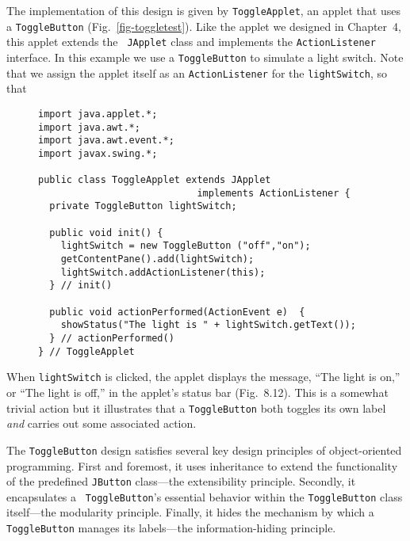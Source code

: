 The implementation of this design is given by {\tt ToggleApplet}, an
applet that uses a {\tt ToggleButton} (Fig.~\ref{fig-toggletest}).
Like the applet we designed in Chapter~4, this applet extends the {\tt
JApplet} class and implements the {\tt ActionListener} interface.  In
this example we use a {\tt ToggleButton} to simulate a light switch.
Note that we assign the applet itself as an {\tt ActionListener} for
the {\tt lightSwitch}, so that

\begin{figure}[tb]
\jjjprogstart
\begin{jjjlisting}
\begin{lstlisting}
import java.applet.*;
import java.awt.*;
import java.awt.event.*;
import javax.swing.*;

public class ToggleApplet extends JApplet 
                            implements ActionListener {
  private ToggleButton lightSwitch;  

  public void init() {
    lightSwitch = new ToggleButton ("off","on");
    getContentPane().add(lightSwitch);
    lightSwitch.addActionListener(this);
  } // init()

  public void actionPerformed(ActionEvent e)  {
    showStatus("The light is " + lightSwitch.getText());
  } // actionPerformed()
} // ToggleApplet
\end{lstlisting}
\end{jjjlisting}
\end{figure}

When {\tt lightSwitch} is clicked, the applet displays the message,
``The light is on,'' or ``The light is off,'' in the applet's status
bar (Fig.~8.12). This is a somewhat trivial action but it illustrates
that a {\tt ToggleButton} both toggles its own label {\it and} carries
out some associated action.

\begin{figure}[h!]
\end{figure}

The {\tt ToggleButton} design satisfies several key design
principles of object-oriented
programming.  First and foremost, it uses inheritance to extend the
functionality of the predefined {\tt JButton} class---the
extensibility principle. Secondly, it encapsulates a {\tt
ToggleButton}'s essential behavior within the {\tt ToggleButton} class
itself---the modularity principle. Finally, it hides the mechanism by
which a {\tt ToggleButton} manages its labels---the information-hiding
principle.

